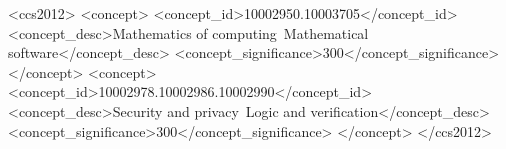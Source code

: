 \documentclass[sigplan]{acmart}\settopmatter{}
\newcommand{\mathlib}{\textsf{mathlib}\xspace}
\begin{document}


\begin{abstract}
This paper describes \mathlib,
a community-driven effort to build a unified library of mathematics
formalized in the Lean proof assistant.
Among proof assistant libraries,
it is distinguished by
its dependently typed foundations,
focus on classical mathematics,
extensive hierarchy of structures,
use of large- and small-scale automation,
and distributed organization.
We explain the architecture and design decisions of the library
and the social organization that has led to its development.
\end{abstract}

\begin{CCSXML}
<ccs2012>
<concept>
<concept_id>10002950.10003705</concept_id>
<concept_desc>Mathematics of computing~Mathematical software</concept_desc>
<concept_significance>300</concept_significance>
</concept>
<concept>
<concept_id>10002978.10002986.10002990</concept_id>
<concept_desc>Security and privacy~Logic and verification</concept_desc>
<concept_significance>300</concept_significance>
</concept>
</ccs2012>
\end{CCSXML}

\end{document}
